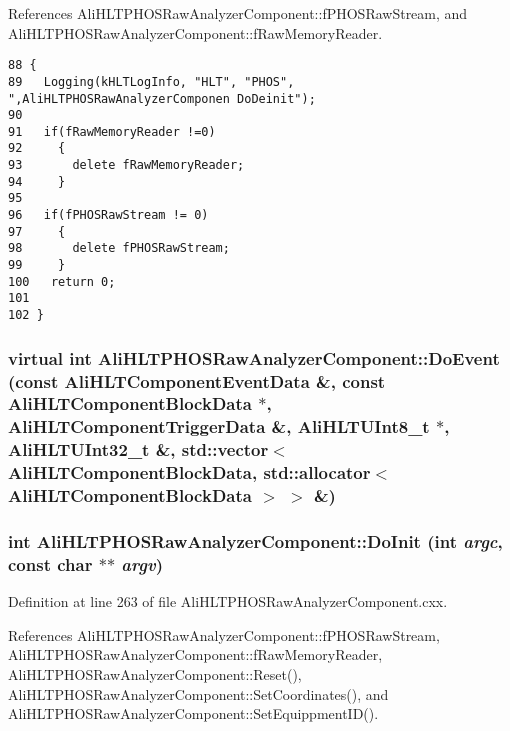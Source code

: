 References Ali\-HLTPHOSRaw\-Analyzer\-Component::f\-PHOSRaw\-Stream, and Ali\-HLTPHOSRaw\-Analyzer\-Component::f\-Raw\-Memory\-Reader.

\footnotesize\begin{verbatim}88 {
89   Logging(kHLTLogInfo, "HLT", "PHOS", ",AliHLTPHOSRawAnalyzerComponen DoDeinit");
90 
91   if(fRawMemoryReader !=0)
92     {
93       delete fRawMemoryReader;
94     }
95     
96   if(fPHOSRawStream != 0)
97     {
98       delete fPHOSRawStream;
99     }
100   return 0;
101 
102 }
\end{verbatim}\normalsize 


\subsubsection{\setlength{\rightskip}{0pt plus 5cm}virtual int Ali\-HLTPHOSRaw\-Analyzer\-Component::Do\-Event (const Ali\-HLTComponent\-Event\-Data \&, const Ali\-HLTComponent\-Block\-Data $\ast$, Ali\-HLTComponent\-Trigger\-Data \&, Ali\-HLTUInt8\_\-t $\ast$, Ali\-HLTUInt32\_\-t \&, std::vector$<$ Ali\-HLTComponent\-Block\-Data, std::allocator$<$ Ali\-HLTComponent\-Block\-Data $>$ $>$ \&)\hspace{0.3cm}{\tt  [virtual, inherited]}}\label{classAliHLTPHOSRawAnalyzerComponent_AliHLTPHOSRawAnalyzerPeakFinderComponenta16}


\subsubsection{\setlength{\rightskip}{0pt plus 5cm}int Ali\-HLTPHOSRaw\-Analyzer\-Component::Do\-Init (int {\em argc}, const char $\ast$$\ast$ {\em argv})\hspace{0.3cm}{\tt  [virtual, inherited]}}\label{classAliHLTPHOSRawAnalyzerComponent_AliHLTPHOSRawAnalyzerPeakFinderComponenta4}




Definition at line 263 of file Ali\-HLTPHOSRaw\-Analyzer\-Component.cxx.

References Ali\-HLTPHOSRaw\-Analyzer\-Component::f\-PHOSRaw\-Stream, Ali\-HLTPHOSRaw\-Analyzer\-Component::f\-Raw\-Memory\-Reader, Ali\-HLTPHOSRaw\-Analyzer\-Component::Reset(), Ali\-HLTPHOSRaw\-Analyzer\-Component::Set\-Coordinates(), and Ali\-HLTPHOSRaw\-Analyzer\-Component::Set\-Equippment\-ID().

